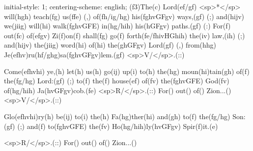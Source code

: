 initial-style: 1;
centering-scheme: english;
(f3)The(c) Lord(ef/gf) <sp>*</sp> will(hgh) teach(fg) us(ffe) (,) of(fh/ig/hg) his(fghvGFgv) ways,(gf) (;) and(hijv) we(jiig) will(hi) walk(fghvGFE) in(hg/hih) his(hGFgv) paths.(gf) (:) For(f) out(fc) of(efgv) Zi(f)on(f) shall(fg) go(f) forth(fe/fhivHGhih) the(iv) law,(ih) (;) and(hijv) the(jiig) word(hi) of(hi) the(ghGFgv) Lord(gf) (,) from(hhg) Je(efhv)ru(hf/ghg)sa(fghvGFgv)lem.(gf) <sp>V/</sp>.(::) 

Come(efhvhi) ye,(h) let(h) us(h) go(ij) up(i) to(h) the(hg) moun(hi)tain(gh) of(f) the(fg/hg) Lord:(gf) (;) to(f) the(f) house(ef) of(fv) the(fghvGFE) God(fv) of(hg/hih) Ja(hvGFgv)cob.(fe) <sp>R/</sp>.(::) For() out() of() Zion...() <sp>V/</sp>.(::)

Glo(efhvhi)ry(h) be(ij) to(i) the(h) Fa(hg)ther(hi) and(gh) to(f) the(fg/hg) Son:(gf) (;) and(f) to(fghvGFE) the(fv) Ho(hg/hih)ly(hvGFgv) Spir(f)it.(e)

<sp>R/</sp>.(::) For() out() of() Zion...()